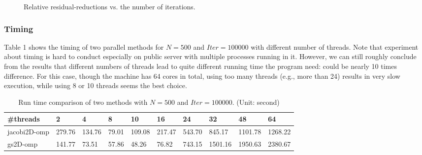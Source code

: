 \documentclass[11pt, oneside]{article}   	%
\begin{document}
\begin{figure}[ht]
\caption{Relative residual-reductions vs. the number of iterations.}
\end{figure}
\subsubsection{Timing}
Table 1 shows the timing of two parallel methods for $N=500$ and $Iter= 100000$ with different number of threads. Note that experiment about timing is hard to conduct especially on public server with multiple processes running in it. However, we can still roughly conclude from the results that different numbers of threads lead to quite different running time the program need: could be nearly 10 times difference. For this case, though the machine has 64 cores in total, using too many threads (e.g., more than 24) results in very slow execution, while using 8 or 10 threads seems the best choice.
\begin{table}[ht]
\centering
\caption{Run time comparison of two methods with $N=500$ and $Iter= 100000$. (Unit: second)}
\begin{tabular}{|l|l|l|l|l|l|l|l|l|l|}
\hline
\#threads             & 2 & 4 & 8 & 10 & 16 & 24 & 32 & 48 & 64 \\ \hline
jacobi2D-omp  & 279.76  & 134.76  & 79.01  & 109.08   & 217.47   & 543.70   & 845.17   &  1101.78  & 1268.22   \\ \hline
gs2D-omp      &  141.77 & 73.51  & 57.86  &  48.26 & 76.82   & 743.15   &  1501.16  &  1950.63  &  2380.67  \\ \hline
\end{tabular}
\end{table}
\end{document}
